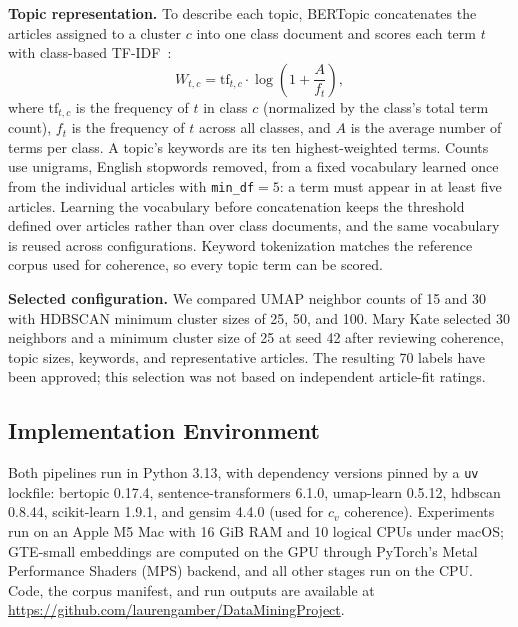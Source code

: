 \documentclass[conference]{IEEEtran}
\begin{document}
\textbf{Topic representation.} To describe each topic, BERTopic concatenates the articles assigned to a cluster $c$ into one class document and scores each term $t$ with class-based TF-IDF~\cite{grootendorst2022bertopic}:
\begin{equation}
W_{t,c} = \mathrm{tf}_{t,c}\cdot\log\!\left(1+\frac{A}{f_t}\right),
\label{eq:ctfidf}
\end{equation}
where $\mathrm{tf}_{t,c}$ is the frequency of $t$ in class $c$ (normalized by the class's total term count), $f_t$ is the frequency of $t$ across all classes, and $A$ is the average number of terms per class. A topic's keywords are its ten highest-weighted terms. Counts use unigrams, English stopwords removed, from a fixed vocabulary learned once from the individual articles with \texttt{min\_df}$=5$: a term must appear in at least five articles. Learning the vocabulary before concatenation keeps the threshold defined over articles rather than over class documents, and the same vocabulary is reused across configurations. Keyword tokenization matches the reference corpus used for coherence, so every topic term can be scored.

\textbf{Selected configuration.} We compared UMAP neighbor counts of 15 and 30 with HDBSCAN minimum cluster sizes of 25, 50, and 100. Mary Kate selected 30 neighbors and a minimum cluster size of 25 at seed 42 after reviewing coherence, topic sizes, keywords, and representative articles. The resulting 70 labels have been approved; this selection was not based on independent article-fit ratings.

\subsection*{Implementation Environment}
Both pipelines run in Python 3.13, with dependency versions pinned by a \texttt{uv} lockfile: bertopic 0.17.4, sentence-transformers 6.1.0, umap-learn 0.5.12, hdbscan 0.8.44, scikit-learn 1.9.1, and gensim 4.4.0 (used for $c_v$ coherence). Experiments run on an Apple M5 Mac with 16 GiB RAM and 10 logical CPUs under macOS; GTE-small embeddings are computed on the GPU through PyTorch's Metal Performance Shaders (MPS) backend, and all other stages run on the CPU. Code, the corpus manifest, and run outputs are available at \url{https://github.com/laurengamber/DataMiningProject}.
\end{document}
